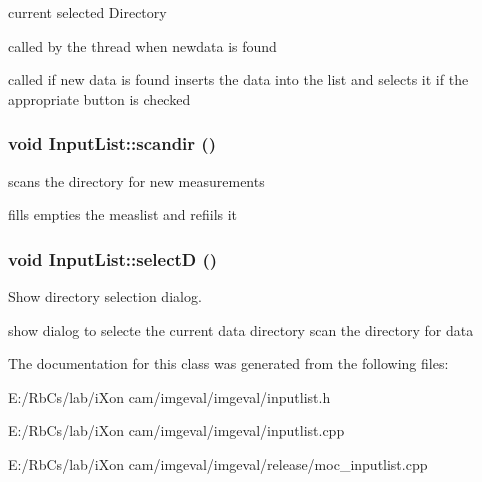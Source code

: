 current selected Directory 

called by the thread when newdata is found

called if new data is found inserts the data into the list and selects it if the appropriate button is checked \hypertarget{class_input_list_03015f736a0d4684e255f89f26d4590b}{
\subsubsection[{scandir}]{\setlength{\rightskip}{0pt plus 5cm}void InputList::scandir ()}}
\label{class_input_list_03015f736a0d4684e255f89f26d4590b}


scans the directory for new measurements 

fills empties the measlist and refiils it \hypertarget{class_input_list_5644d4b644bf4fb1849bfe89b68559ec}{
\subsubsection[{selectD}]{\setlength{\rightskip}{0pt plus 5cm}void InputList::selectD ()}}
\label{class_input_list_5644d4b644bf4fb1849bfe89b68559ec}


Show directory selection dialog. 

show dialog to selecte the current data directory scan the directory for data 

The documentation for this class was generated from the following files:\begin{CompactItemize}
\item 
E:/RbCs/lab/iXon cam/imgeval/imgeval/inputlist.h\item 
E:/RbCs/lab/iXon cam/imgeval/imgeval/inputlist.cpp\item 
E:/RbCs/lab/iXon cam/imgeval/imgeval/release/moc\_\-inputlist.cpp\end{CompactItemize}
